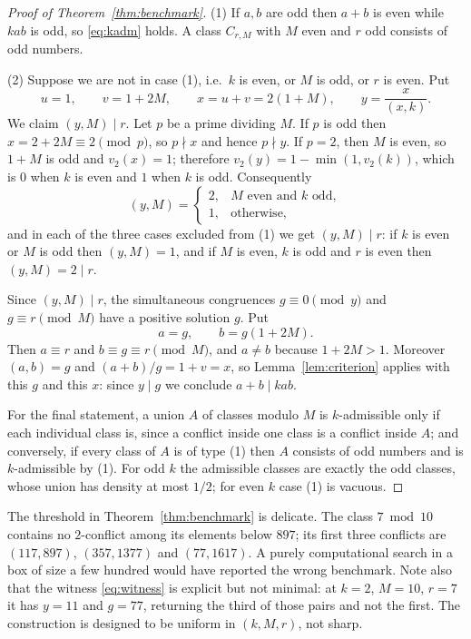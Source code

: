 \documentclass[11pt]{article}
\begin{document}
\begin{proof}[Proof of Theorem~\ref{thm:benchmark}]
(1) If \(a,b\) are odd then \(a+b\) is even while \(kab\) is odd, so
\eqref{eq:kadm} holds. A class \(C_{r,M}\) with \(M\) even and \(r\) odd
consists of odd numbers.

(2) Suppose we are not in case (1), i.e.\ \(k\) is even, or \(M\) is odd, or
\(r\) is even. Put
\[
 u=1,\qquad v=1+2M,\qquad x=u+v=2(1+M),\qquad y=\frac{x}{(x,k)} .
\]
We claim \((y,M)\mid r\). Let \(p\) be a prime dividing \(M\). If \(p\) is
odd then \(x=2+2M\equiv2\pmod p\), so \(p\nmid x\) and hence \(p\nmid y\).
If \(p=2\), then \(M\) is even, so \(1+M\) is odd and \(v_2(x)=1\); therefore
\(v_2(y)=1-\min(1,v_2(k))\), which is \(0\) when \(k\) is even and \(1\) when
\(k\) is odd. Consequently
\[
 (y,M)=
 \begin{cases}
 2,&\text{\(M\) even and \(k\) odd},\\
 1,&\text{otherwise},
 \end{cases}
\]
and in each of the three cases excluded from (1) we get \((y,M)\mid r\):
if \(k\) is even or \(M\) is odd then \((y,M)=1\), and if \(M\) is even,
\(k\) is odd and \(r\) is even then \((y,M)=2\mid r\).

Since \((y,M)\mid r\), the simultaneous congruences \(g\equiv0\pmod y\) and
\(g\equiv r\pmod M\) have a positive solution \(g\). Put
\begin{equation}\label{eq:witness}
 a=g,\qquad b=g(1+2M).
\end{equation}
Then \(a\equiv r\) and \(b\equiv g\equiv r\pmod M\), and \(a\ne b\) because
\(1+2M>1\). Moreover \((a,b)=g\) and \((a+b)/g=1+v=x\), so
Lemma~\ref{lem:criterion} applies with this \(g\) and this \(x\): since \(y\mid g\)
we conclude \(a+b\mid kab\).

For the final statement, a union \(A\) of classes modulo \(M\) is
\(k\)-admissible only if each individual class is, since a conflict inside one
class is a conflict inside \(A\); and conversely, if every class of \(A\) is
of type (1) then \(A\) consists of odd numbers and is \(k\)-admissible by (1).
For odd \(k\) the admissible classes are exactly the odd classes, whose union
has density at most \(1/2\); for even \(k\) case (1) is vacuous.
\end{proof}

\begin{remark}
The threshold in Theorem~\ref{thm:benchmark} is delicate. The class
\(7\bmod10\) contains no \(2\)-conflict among its elements below \(897\); its
first three conflicts are \((117,897)\), \((357,1377)\) and \((77,1617)\). A
purely computational search in a box of size a few hundred would have reported
the wrong benchmark. Note also that the witness \eqref{eq:witness} is explicit
but not minimal: at \(k=2\), \(M=10\), \(r=7\) it has \(y=11\) and \(g=77\),
returning the third of those pairs and not the first. The construction is
designed to be uniform in \((k,M,r)\), not sharp.
\end{remark}
\end{document}
